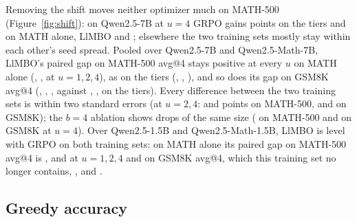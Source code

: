 \documentclass[twoside]{article}
\newcommand{\llmbo}{LlMBO}
\begin{document}
Removing the shift moves neither optimizer much on MATH-500 (Figure~\ref{fig:shift}): on Qwen2.5-7B at $u = 4$ GRPO gains \gainGrpoMeanQwenUFourMathFive{} points on the tiers and \gainGrpoMeanQwenUFourMathFiveMathTrain{} on MATH alone, \llmbo{} \gainToneMeanQwenUFourMathFive{} and \gainToneMeanQwenUFourMathFiveMathTrain{}; elsewhere the two training sets mostly stay within each other's seed spread.
Pooled over Qwen2.5-7B and Qwen2.5-Math-7B, \llmbo{}'s paired gap on MATH-500 avg@4 stays positive at every $u$ on MATH alone (\poolToneMeanUOneMathFiveShiftLargeMathTrain{}, \poolToneMeanUTwoMathFiveShiftLargeMathTrain{}, \poolToneMeanUFourMathFiveShiftLargeMathTrain{} at $u = 1, 2, 4$), as on the tiers (\poolToneMeanUOneMathFiveShiftLarge{}, \poolToneMeanUTwoMathFiveShiftLarge{}, \poolToneMeanUFourMathFiveShiftLarge{}), and so does its gap on GSM8K avg@4 (\poolToneMeanUOneGsmShiftLargeMathTrain{}, \poolToneMeanUTwoGsmShiftLargeMathTrain{}, \poolToneMeanUFourGsmShiftLargeMathTrain{}, against \poolToneMeanUOneGsmShiftLarge{}, \poolToneMeanUTwoGsmShiftLarge{}, \poolToneMeanUFourGsmShiftLarge{} on the tiers).
Every difference between the two training sets is within two standard errors (at $u = 2, 4$: \shiftDeltaToneMeanUTwoMathFiveLarge{} and \shiftDeltaToneMeanUFourMathFiveLarge{} points on MATH-500, \shiftDeltaToneMeanUTwoGsmLarge{} and \shiftDeltaToneMeanUFourGsmLarge{} on GSM8K); the $b = 4$ ablation shows drops of the same size (\shiftDeltaBFourToneMeanUFourMathFiveLarge{} on MATH-500 and \shiftDeltaBFourToneMeanUFourGsmLarge{} on GSM8K at $u = 4$).
Over Qwen2.5-1.5B and Qwen2.5-Math-1.5B, \llmbo{} is level with GRPO on both training sets: on MATH alone its paired gap on MATH-500 avg@4 is \poolToneMeanUOneMathFiveShiftSmallMathTrain{}, \poolToneMeanUTwoMathFiveShiftSmallMathTrain{} and \poolToneMeanUFourMathFiveShiftSmallMathTrain{} at $u = 1, 2, 4$ and on GSM8K avg@4, which this training set no longer contains, \poolToneMeanUOneGsmShiftSmallMathTrain{}, \poolToneMeanUTwoGsmShiftSmallMathTrain{} and \poolToneMeanUFourGsmShiftSmallMathTrain{}.

\FloatBarrier
\subsection{Greedy accuracy}
\label{app:shift-greedy}
\end{document}
